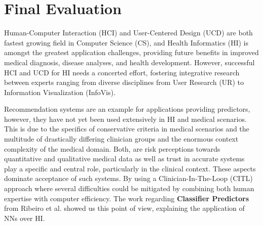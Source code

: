 \section{Final Evaluation}


Human-Computer Interaction (HCI) and User-Centered Design (UCD) are both fastest growing field in Computer Science (CS), and Health Informatics (HI) is amongst the greatest application challenges, providing future benefits in improved medical diagnosis, disease analyses, and health development. However, successful HCI and UCD for HI needs a concerted effort, fostering integrative research between experts ranging from diverse disciplines from User Research (UR) to Information Visualization (InfoVis).

Recommendation systems are an example for applications providing predictors, however, they have not yet been used extensively in HI and medical scenarios. This is due to the specifics of conservative criteria in medical scenarios and the multitude of drastically differing clinician groups and the enormous context complexity of the medical domain. Both, are risk perceptions towards quantitative and qualitative medical data as well as trust in accurate systems play a specific and central role, particularly in the clinical context. These aspects dominate acceptance of such systems. By using a Clinician-In-The-Loop (CITL) approach where several difficulties could be mitigated by combining both human expertise with computer efficiency. The work regarding \textbf{Classifier Predictors} from Ribeiro et al. \cite{ribeiro2016should} showed us this point of view, explaining the application of NNs over HI.